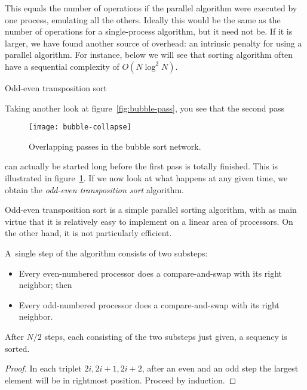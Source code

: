 This equals the number of operations if the parallel algorithm were
executed by one process, emulating all the others. Ideally this would
be the same as the number of operations for a single-process
algorithm, but it need not be. If it is larger, we have found another
source of overhead: an intrinsic penalty for using a parallel
algorithm.
For instance, below we will see that sorting algorithm often have a
sequential complexity of $O(N\log^2N)$.


 {Odd-even transposition sort}

Taking another look at figure~\ref{fig:bubble-pass}, you see that the
second pass
%
\begin{figure}[ht]
  \texttt{[image: bubble-collapse]}
  \caption{Overlapping passes in the bubble sort network.}
  \label{fig:bubble-collapse}
\end{figure}
%
can actually be started long before the first pass is totally
finished. This is illustrated in figure~\ref{fig:bubble-collapse}.
If we now look at what happens at any given time, we obtain the 
\emph{odd-even transposition sort} algorithm.

Odd-even transposition sort is a simple parallel sorting
algorithm, with as main virtue that it is relatively easy to implement
on a linear area of processors. On the other hand, it is not
particularly efficient.

A~single step of the
algorithm consists of two substeps:
\begin{itemize}
\item Every even-numbered processor does a compare-and-swap
  with its right neighbor; then
\item Every odd-numbered processor does a compare-and-swap
  with its right neighbor.
\end{itemize}

\begin{theorem}
  After $N/2$ steps, each consisting of the two substeps just given,
  a sequency is sorted.
\end{theorem}
\begin{proof}
  In each triplet $2i,2i+1,2i+2$, after an even and an odd step the
  largest element will be in rightmost position. Proceed by induction.
\end{proof}

